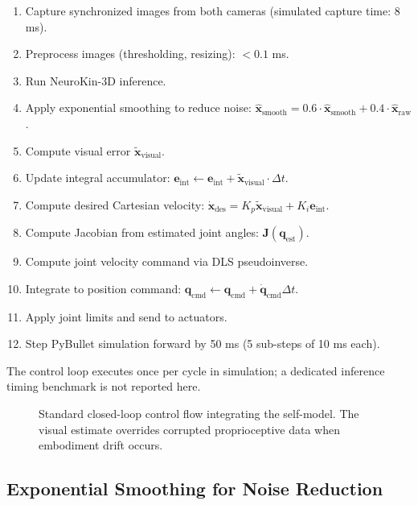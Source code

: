 \documentclass[12pt,a4paper,oneside]{report}
\begin{document}
\begin{enumerate}
    \item Capture synchronized images from both cameras (simulated capture time: 8 ms).
    \item Preprocess images (thresholding, resizing): $<0.1$ ms.
    \item Run NeuroKin-3D inference.
    \item Apply exponential smoothing to reduce noise: $\hat{\mathbf{x}}_{\text{smooth}} = 0.6 \cdot \hat{\mathbf{x}}_{\text{smooth}} + 0.4 \cdot \hat{\mathbf{x}}_{\text{raw}}$.
    \item Compute visual error $\tilde{\mathbf{x}}_{\text{visual}}$.
    \item Update integral accumulator: $\mathbf{e}_{\text{int}} \leftarrow \mathbf{e}_{\text{int}} + \tilde{\mathbf{x}}_{\text{visual}} \cdot \Delta t$.
    \item Compute desired Cartesian velocity: $\dot{\mathbf{x}}_{\text{des}} = K_p \tilde{\mathbf{x}}_{\text{visual}} + K_i \mathbf{e}_{\text{int}}$.
    \item Compute Jacobian from estimated joint angles: $\mathbf{J}(\mathbf{q}_{\text{est}})$.
    \item Compute joint velocity command via DLS pseudoinverse.
    \item Integrate to position command: $\mathbf{q}_{\text{cmd}} \leftarrow \mathbf{q}_{\text{cmd}} + \dot{\mathbf{q}}_{\text{cmd}} \Delta t$.
    \item Apply joint limits and send to actuators.
    \item Step PyBullet simulation forward by 50 ms (5 sub-steps of 10 ms each).
\end{enumerate}

The control loop executes once per cycle in simulation; a dedicated inference timing benchmark is not reported here.

\begin{figure}[H]
    \centering
    \caption{Standard closed-loop control flow integrating the self-model. The visual estimate overrides corrupted proprioceptive data when embodiment drift occurs.}
    \label{fig:control_loop}
\end{figure}

\subsection{Exponential Smoothing for Noise Reduction}
\label{subsec:exponential_smoothing_for_noise_reduction}
\end{document}
